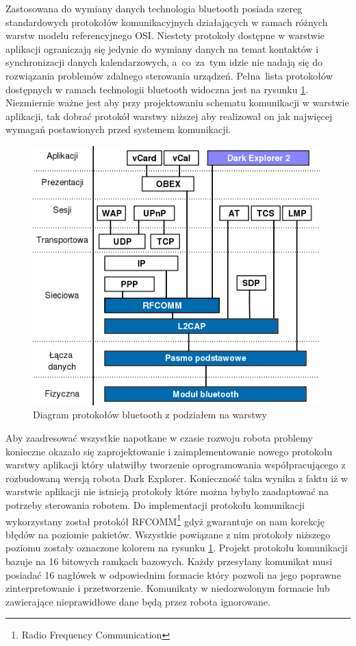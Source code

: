 Zastosowana do wymiany danych technologia bluetooth posiada szereg standardowych
protokołów komunikacyjnych działających w ramach różnych warstw modelu
referencyjnego OSI. Niestety protokoły dostępne w warstwie aplikacji ograniczają
się jedynie do wymiany danych na temat kontaktów i synchronizacji danych
kalendarzowych, a~co~za~tym idzie nie nadają się do rozwiązania problemów
zdalnego sterowania urządzeń. Pełna~lista protokołów dostępnych w ramach
technologii bluetooth widoczna jest na rysunku \ref{fig:BtStack}. Niezmiernie
ważne jest aby przy projektowaniu schematu komunikacji w warstwie aplikacji, tak
dobrać protokół warstwy niższej aby realizował on jak najwięcej wymagań
postawionych przed systemem komunikacji.

\begin{figure}[h!]
 \centering 
 \includegraphics[height=100mm]{../images/ch05/btstack.png}
 \caption{Diagram protokołów bluetooth z podziałem na warstwy}
 \label{fig:BtStack}
\end{figure}

Aby zaadresować wszystkie napotkane w czasie rozwoju robota problemy konieczne
okazało się zaprojektowanie i zaimplementowanie nowego protokołu warstwy
aplikacji który ułatwiłby tworzenie oprogramowania współpracującego z rozbudowaną
wersją robota Dark Explorer. Konieczność taka wynika z faktu iż w warstwie
aplikacji nie istnieją protokoły które można bybyło zaadaptować na potrzeby
sterowania robotem.  Do implementacji protokołu komunikacji wykorzystany został
protokół RFCOMM\footnote{Radio Frequency Communication} gdyż gwarantuje on nam
korekcję błędów na poziomie pakietów. Wszystkie powiązane z nim protokoły
niższego poziomu zostały oznaczone kolorem na rysunku \ref{fig:BtStack}. Projekt
protokołu komunikacji bazuje na 16 bitowych ramkach bazowych. Każdy przesyłany
komunikat musi posiadać 16 nagłówek w odpowiednim formacie który pozwoli na jego
poprawne zinterpretowanie i przetworzenie. Komunikaty w niedozwolonym formacie
lub zawierające nieprawidłowe dane będą przez robota ignorowane.

